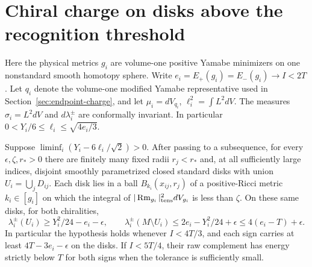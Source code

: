\section{Chiral charge on disks above the recognition threshold}
\label{sec:band-charge}

Here the physical metrics \(g_i\) are volume-one positive Yamabe
minimizers on one nonstandard smooth homotopy sphere. Write
\(e_i=E_+(g_i)=E_-(g_i)\to I<2T\). Let \(q_i\) denote the
volume-one modified Yamabe representative used in
Section~\ref{sec:endpoint-charge}, and let
\(\mu_i=dV_{q_i}\), \(\ell_i^2=\int L^2dV\). The measures
\(\sigma_i=L^2dV\) and \(d\lambda_i^\pm\) are conformally invariant.
In particular \(0<Y_i/6\le\ell_i\le\sqrt{4e_i/3}\).

\begin{theorem}\label{thm:band-charge}
Suppose \(\liminf_i(Y_i-6\ell_i/\sqrt{2})>0\). After passing to
a subsequence, for every \(\epsilon,\zeta,r_*>0\) there are finitely
many fixed radii \(r_j<r_*\) and, at all sufficiently large indices,
disjoint smoothly parametrized closed standard disks with union
\(U_i=\bigcup_j D_{ij}\). Each disk lies in a ball
\(B_{k_i}(x_{ij},r_j)\) of a positive-Ricci metric \(k_i\in[g_i]\)
on which the integral of \(|\operatorname{Rm}_{g_i}|_{\rm tens}^2dV_{g_i}\)
is less than \(\zeta\). On these same disks, for both chiralities,
\begin{equation}\label{eq:band-charge-residual}
 \lambda_i^\pm(U_i)\ge Y_i^2/24-e_i-\epsilon,\qquad
 \lambda_i^\pm(M\setminus U_i)\le 2e_i-Y_i^2/24+\epsilon
                                  \le 4(e_i-T)+\epsilon .
\end{equation}
In particular the hypothesis holds whenever \(I<4T/3\), and each
sign carries at least \(4T-3e_i-\epsilon\) on the disks. If
\(I<5T/4\), their raw complement has energy strictly below \(T\)
for both signs when the tolerance is sufficiently small.
\end{theorem}

